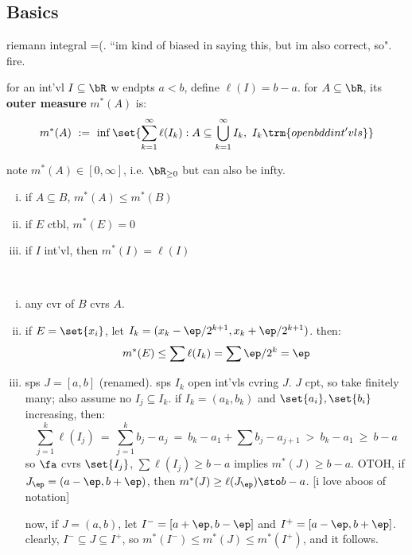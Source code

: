 \subsection{Basics}

riemann integral =(.
``im kind of biased in saying this, but im also correct, so". fire.

\begin{defn}
	for an int'vl $I\subseteq\bR$ w endpts $a<b$, define $\ell(I)=b-a$.
	for $A\subseteq\bR$, its \textbf{outer measure} $m^{*}(A)$ is:
	\begin{equation*}
		m^{*}(A) \ := \ \inf\set{\sum_{k=1}^{\infty}\ell(I_{k}): A\subseteq\bigcup_{k=1}^{\infty}I_{k}, \  I_{k} \trm{ open bdd int'vls}}
	\end{equation*}
\end{defn}
note $m^{*}(A)\in[0,\infty]$, i.e. $\bR_{\geq0}$ but can also be infty.

\begin{prop} \vspace{-0.2in}
	\begin{enumerate}[i)]
		\item if $A\subseteq B$, $m^{*}(A)\leq m^{*}(B)$
		\item if $E$ ctbl, $m^{*}(E)=0$
		\item if $I$ int'vl, then $m^{*}(I)=\ell(I)$
	\end{enumerate}
\end{prop} \

\begin{pf} \vspace{-0.2in}
	\begin{enumerate}[i)]
		\item any cvr of $B$ cvrs $A$.
		\item if $E=\set{x_{i}}$, let $I_{k}=(x_{k}-\ep/2^{k+1},x_{k}+\ep/2^{k+1})$. then:
			\begin{equation*}
				m^{*}(E)\leq\sum\ell(I_{k})=\sum\ep/2^{k}=\ep
			\end{equation*}
		\item sps $J=[a,b]$ (renamed). sps $I_{k}$ open int'vls cvring $J$.
			$J$ cpt, so take finitely many; also assume no $I_{j}\subseteq I_{k}$.
			if $I_{k}=(a_{k},b_{k})$ and $\set{a_{i}},\set{b_{i}}$ increasing, then:
			\begin{equation*}
				\sum_{j=1}^{k}\ell(I_{j}) \ = \ \sum_{j=1}^{k}b_{j}-a_{j}
				\ = \ b_{k}-a_{1}+\sum b_{j}-a_{j+1} \ > \ b_{k}-a_{1} \ \geq \ b-a
			\end{equation*}
			so $\fa$ cvrs $\set{I_{j}}$, $\sum\ell(I_{j})\geq b-a$ implies $m^{*}(J)\geq b-a$.
			OTOH, if $J_{\ep}=(a-\ep,b+\ep)$, then $m^{*}(J)\geq\ell(J_{\ep})\sto b-a$.
			[i love aboos of notation]

			now, if $J=(a,b)$, let $I^{-}=[a+\ep,b-\ep]$ and $I^{+}=[a-\ep,b+\ep]$.
			clearly, $I^{-}\subseteq J\subseteq I^{+}$,
			so $m^{*}(I^{-})\leq m^{*}(J)\leq m^{*}(I^{+})$, and it follows.
	\end{enumerate}
\end{pf} \

